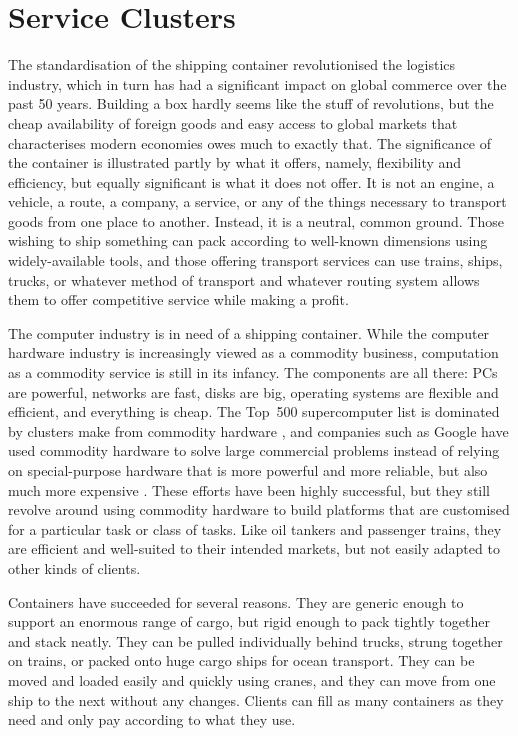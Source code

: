 \chapter{Service Clusters}\label{cha:motivation}

The standardisation of the shipping container revolutionised the logistics industry, which in turn has had a significant impact on global commerce over the past 50 years. Building a box hardly seems like the stuff of revolutions, but the cheap availability of foreign goods and easy access to global markets that characterises modern economies owes much to exactly that. The significance of the container is illustrated partly by what it offers, namely, flexibility and efficiency, but equally significant is what it does not offer. It is not an engine, a vehicle, a route, a company, a service, or any of the things necessary to transport goods from one place to another. Instead, it is a neutral, common ground. Those wishing to ship something can pack according to well-known dimensions using widely-available tools, and those offering transport services can use trains, ships, trucks, or whatever method of transport and whatever routing system allows them to offer competitive service while making a profit.

The computer industry is in need of a shipping container. While the computer hardware industry is increasingly viewed as a commodity business, computation as a commodity service is still in its infancy. The components are all there: PCs are powerful, networks are fast, disks are big, operating systems are flexible and efficient, and everything is cheap. The Top~500 supercomputer list is dominated by clusters make from commodity hardware \cite{top500}, and companies such as Google have used commodity hardware to solve large commercial problems instead of relying on special-purpose hardware that is more powerful and more reliable, but also much more expensive \cite{barroso03,ghemawat}. These efforts have been highly successful, but they still revolve around using commodity hardware to build platforms that are customised for a particular task or class of tasks. Like oil tankers and passenger trains, they are efficient and well-suited to their intended markets, but not easily adapted to other kinds of clients.

Containers have succeeded for several reasons. They are generic enough to support an enormous range of cargo, but rigid enough to pack tightly together and stack neatly. They can be pulled individually behind trucks, strung together on trains, or packed onto huge cargo ships for ocean transport. They can be moved and loaded easily and quickly using cranes, and they can move from one ship to the next without any changes. Clients can fill as many containers as they need and only pay according to what they use.

